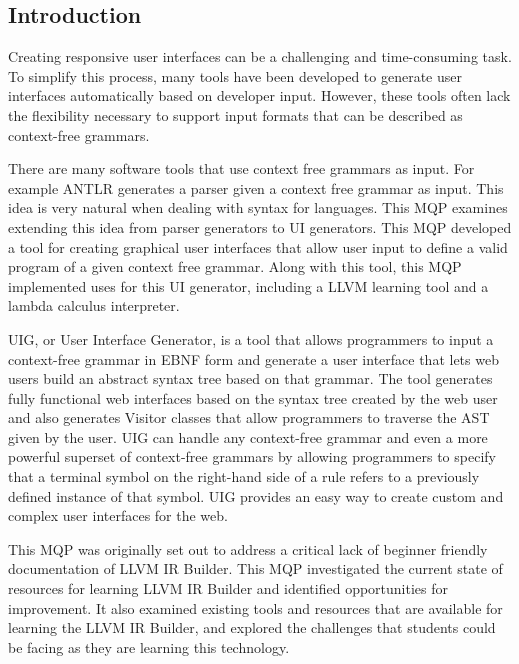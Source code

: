 \documentclass[hidelinks,12pt]{article}
\begin{document}
\newpage %
\begin{doublespacing} %
\setcounter{page}{1} %


\section{Introduction}

Creating responsive user interfaces can be a challenging and time-consuming task. To simplify this process, many tools have been developed to generate user interfaces automatically based on developer input. However, these tools often lack the flexibility necessary to support input formats that can be described as context-free grammars.

There are many software tools that use context free grammars as input. For example ANTLR generates a parser given a context free grammar as input. This idea is very natural when dealing with syntax for languages. This MQP examines extending this idea from parser generators to UI generators. This MQP developed a tool for creating graphical user interfaces that allow user input to define a valid program of a given context free grammar. Along with this tool, this MQP implemented uses for this UI generator, including a LLVM learning tool and a lambda calculus interpreter.

UIG, or User Interface Generator, is a tool that allows programmers to input a context-free grammar in EBNF form and generate a user interface that lets web users build an abstract syntax tree based on that grammar. The tool generates fully functional web interfaces based on the syntax tree created by the web user and also generates Visitor classes that allow programmers to traverse the AST given by the user. UIG can handle any context-free grammar and even a more powerful superset of context-free grammars by allowing programmers to specify that a terminal symbol on the right-hand side of a rule refers to a previously defined instance of that symbol. UIG provides an easy way to create custom and complex user interfaces for the web.

This MQP was originally set out to address a critical lack of beginner friendly documentation of LLVM IR Builder. This MQP investigated the current state of resources for learning LLVM IR Builder and identified opportunities for improvement. It also examined existing tools and resources that are available for learning the LLVM IR Builder, and explored the challenges that students could be facing as they are learning this technology.


\end{doublespacing}
\end{document}
